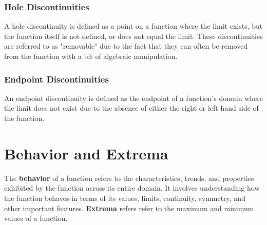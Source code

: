 \documentclass[11pt]{article}
\begin{document}
\subsubsection*{Hole Discontinuities}
A hole discontinuity is defined as a point on a function where the limit exists, but the function itself is not defined, or does not equal the limit. These discontinuities are referred to as "removable" due to the fact that they can often be removed from the function with a bit of algebraic manipulation.

\begin{center}
\end{center}

\subsubsection*{Endpoint Discontinuities}
An endpoint discontinuity is defined as the endpoint of a function's domain where the limit does not exist due to the absence of either the right or left hand side of the function. 

\begin{center}
\end{center}

\section{Behavior and Extrema}
The \textbf{behavior} of a function refers to the characteristics, trends, and properties exhibited by the function across its entire domain. It involves understanding how the function behaves in terms of its values, limits, continuity, symmetry, and other important features. \textbf{Extrema} refers refer to the maximum and minimum values of a function.
\end{document}
